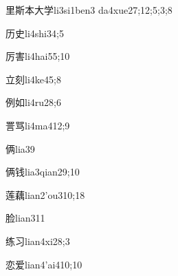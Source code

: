 \begin{verbete}{里斯本大学}{li3si1ben3 da4xue2}{7;12;5;3;8}
\end{verbete}

\begin{verbete}{历史}{li4shi3}{4;5}
\end{verbete}

\begin{verbete}{厉害}{li4hai5}{5;10}
\end{verbete}

\begin{verbete}{立刻}{li4ke4}{5;8}
\end{verbete}

\begin{verbete}{例如}{li4ru2}{8;6}
\end{verbete}

\begin{verbete}{詈骂}{li4ma4}{12;9}
\end{verbete}

\begin{verbete}{俩}{lia3}{9}
\end{verbete}

\begin{verbete}{俩钱}{lia3qian2}{9;10}
\end{verbete}

\begin{verbete}{莲藕}{lian2'ou3}{10;18}
\end{verbete}

\begin{verbete}{脸}{lian3}{11}
\end{verbete}

\begin{verbete}{练习}{lian4xi2}{8;3}
\end{verbete}

\begin{verbete}{恋爱}{lian4'ai4}{10;10}
\end{verbete}

